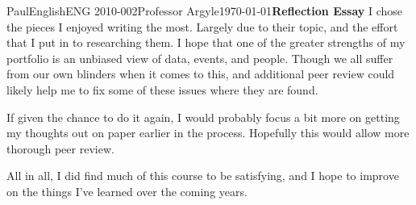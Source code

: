 \documentclass[12pt,letterpaper]{article}
\begin{document}
\begin{mla}{Paul}{English}{ENG 2010-002}{Professor Argyle}{\today}{\textbf{Reflection Essay}}
I chose the pieces I enjoyed writing the most. Largely due to their topic, and the effort that I put in to researching them. I hope that one of the greater strengths of my portfolio is an unbiased view of data, events, and people. Though we all suffer from our own blinders when it comes to this, and additional peer review could likely help me to fix some of these issues where they are found.

If given the chance to do it again, I would probably focus a bit more on getting my thoughts out on paper earlier in the process. Hopefully this would allow more thorough peer review.

All in all, I did find much of this course to be satisfying, and I hope to improve on the things I've learned over the coming years.

\end{mla}
\end{document}
